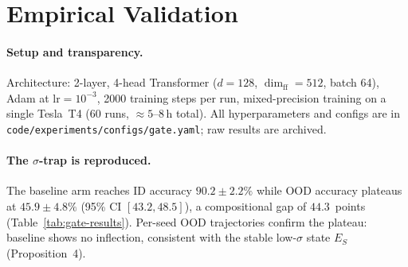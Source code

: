 \documentclass{article}
\theoremstyle{definition}
\begin{document}
\section{Empirical Validation}\label{sec:empirical-validation}

\paragraph*{Setup and transparency.}
Architecture: 2-layer, 4-head Transformer ($d = 128$, $\dim_{\text{ff}} = 512$,
batch 64), Adam at $\text{lr} = 10^{-3}$, 2000 training steps per run,
mixed-precision training on a single Tesla~T4 (60 runs, $\approx 5$--8\,h
total). All hyperparameters and configs are in \texttt{code/experiments/configs/gate.yaml}; raw results are archived.

\paragraph*{The $\sigma$-trap is reproduced.}
The baseline arm reaches ID accuracy $90.2 \pm 2.2\%$ while OOD accuracy
plateaus at $45.9 \pm 4.8\%$ (95\% CI $[43.2, 48.5]$), a compositional
gap of $44.3$~points (Table~\ref{tab:gate-results}). Per-seed OOD trajectories confirm the plateau: baseline shows no inflection, consistent with the stable low-$\sigma$ state $E_S$ (Proposition~4).

\begin{table}[htbp]
\centering
\small
\caption{\textbf{Gate results by condition ($n = 15$ per arm, 2000 steps).}
Figure~\ref{fig:gate-ood} shows trajectory means with 95\% CIs.}\label{tab:gate-results}
\end{table}
\end{document}
